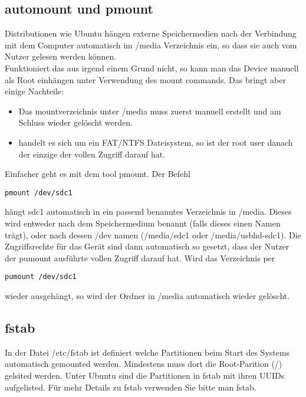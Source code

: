\subsection{automount und pmount}
Distributionen wie Ubuntu h\"angen externe Speichermedien nach der Verbindung mit dem Computer automatisch im /media Verzeichnis ein, so dass sie auch vom Nutzer gelesen werden k\"onnen.\\
Funktioniert das aus irgend einem Grund nicht, so kann man das Device manuell als Root einh\"angen unter Verwendung des mount commands. Das bringt aber einige Nachteile:
\begin{itemize}
\item Das mountverzeichnis unter /media muss zuerst manuell erstellt und am Schluss wieder gel\"oscht werden.
\item handelt es sich um ein FAT/NTFS Dateisystem, so ist der root user danach der einzige der vollen Zugriff darauf hat.
\end{itemize}
Einfacher geht es mit dem tool pmount. Der Befehl
\begin{lstlisting}[frame=single]
pmount /dev/sdc1
\end{lstlisting}
h\"angt sdc1 automatisch in ein passend benanntes Verzeichnis in /media. Dieses wird entweder nach dem Speichermedium benannt (falls dieses einen Namen tr\"agt), oder nach dessen /dev namen (/media/sdc1 oder /media/usbhd-sdc1). Die Zugriffsrechte f\"ur das Ger\"at sind dann automatisch so gesetzt, dass der Nutzer der pumount ausf\"uhrte vollen Zugriff darauf hat. Wird das Verzeichnis per
\begin{lstlisting}[frame=single]
pumount /dev/sdc1
\end{lstlisting}
wieder ausgeh\"angt, so wird der Ordner in /media automatisch wieder gel\"oscht.
\subsection{fstab}
In der Datei /etc/fstab ist definiert welche Partitionen beim Start des Systems automatisch gemounted werden. Mindestens muss dort die Root-Parition (/) gelsited werden. Unter Ubuntu sind die Partitionen in fstab mit ihren UUIDs aufgelisted. F\"ur mehr Details zu fstab verwenden Sie bitte man fstab.
